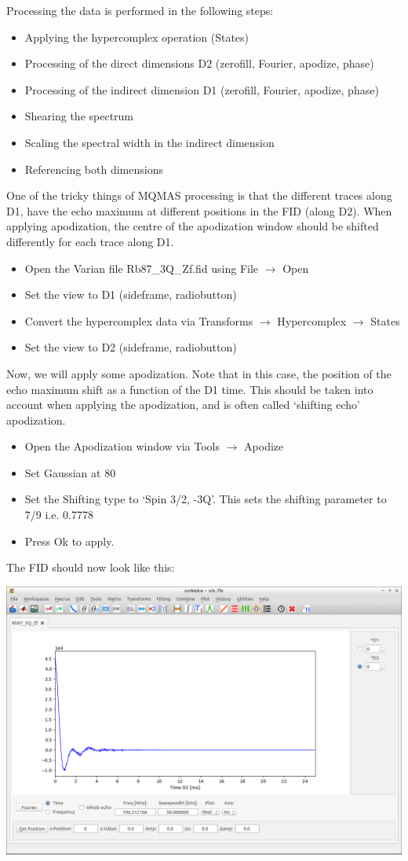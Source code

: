 \documentclass[11pt,a4paper]{article}
\begin{document}
Processing the data is performed in the following steps:
\begin{itemize}
  \item Applying the hypercomplex operation (States)
  \item Processing of the direct dimensions D2 (zerofill, Fourier, apodize, phase)
  \item Processing of the indirect dimension D1 (zerofill, Fourier, apodize, phase)
  \item Shearing the spectrum
  \item Scaling the spectral width in the indirect dimension
  \item Referencing both dimensions
\end{itemize}

One of the tricky things of MQMAS processing is that the different traces along D1, have the echo maximum at different positions in the FID (along D2).
When applying apodization, the centre of the apodization window should be shifted differently for each trace along D1.


\begin{itemize}
	\item Open the Varian file Rb87\_3Q\_Zf.fid using File $\longrightarrow$ Open
	\item Set the view to D1 (sideframe, radiobutton)
	\item Convert the hypercomplex data via Transforms  $\longrightarrow$ Hypercomplex  $\longrightarrow$
	  States
	\item Set the view to D2 (sideframe, radiobutton)
\end{itemize}
Now, we will apply some apodization.
Note that in this case, the position of the echo maximum shift as a function of the D1 time.
This should be taken into account when applying the apodization, and is often called `shifting echo' apodization.

\begin{itemize}
	\item Open the Apodization window via Tools $\longrightarrow$ Apodize
 \item Set Gaussian at 80
 \item Set the Shifting type to `Spin 3/2, -3Q'. This sets the shifting parameter to 7/9 i.e. 0.7778
 \item Press Ok to apply.
\end{itemize}
The FID should now look like this:
\begin{center}
\includegraphics[width=0.8\linewidth]{Figs/Fig1.png}
\end{center}
\end{document}
